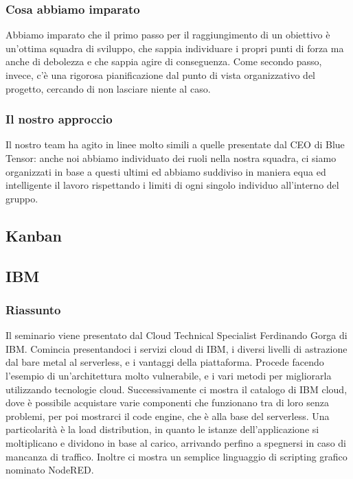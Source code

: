 \documentclass{report}
\begin{document}
\subsubsection*{Cosa abbiamo imparato}
Abbiamo imparato che il primo passo per il raggiungimento di un obiettivo è un'ottima squadra di sviluppo, che sappia individuare i propri punti di forza ma anche di debolezza e che sappia agire di conseguenza. Come secondo passo, invece, c'è una rigorosa pianificazione dal punto di vista organizzativo del progetto, cercando di non lasciare niente al caso.

\subsubsection*{Il nostro approccio}
Il nostro team ha agito in linee molto simili a quelle presentate dal CEO di Blue Tensor: anche noi abbiamo individuato dei ruoli nella nostra squadra, ci siamo organizzati in base a questi ultimi ed abbiamo suddiviso in maniera equa ed intelligente il lavoro rispettando i limiti di ogni singolo individuo all'interno del gruppo.


\subsection{Kanban}

\subsection{IBM}
\subsubsection*{Riassunto}
Il seminario viene  presentato dal Cloud Technical Specialist Ferdinando Gorga di IBM.
Comincia presentandoci i servizi cloud di IBM, i diversi livelli di astrazione dal bare metal al serverless, e i vantaggi della piattaforma.
Procede facendo l'esempio di un'architettura molto vulnerabile, e i vari metodi per migliorarla utilizzando tecnologie cloud.
Successivamente ci mostra il catalogo di IBM cloud, dove è possibile acquistare varie componenti che funzionano tra di loro senza problemi, per poi mostrarci il code engine, che è alla base del serverless. Una particolarità è la load distribution, in quanto le istanze dell'applicazione si moltiplicano e dividono in base al carico,
arrivando perfino a spegnersi in caso di mancanza di traffico. 
Inoltre ci mostra un semplice linguaggio di scripting grafico nominato NodeRED.
\end{document}
